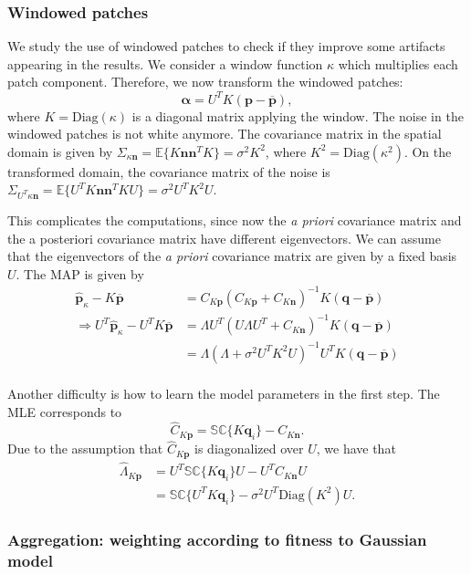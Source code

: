 \documentclass{ipol}
\newcommand{\ma}[1]{\boldsymbol{#1}}
\begin{document}
\clearpage

\subsubsection{Windowed patches}

We study the use of windowed patches to check if they improve some artifacts
appearing in the results. We consider a window function $\kappa$ which multiplies
each patch component. Therefore, we now transform the windowed patches:
\[\ma \alpha = U^TK(\ma p - \overline{\ma p}),\]
where $K = \text{Diag}(\kappa)$ is a diagonal matrix applying the window. The noise
in the windowed patches is not white anymore. The covariance matrix in the spatial
domain is given by $\Sigma_{\kappa\ma n} = \mathbb E\{K\ma n\ma n^TK\} = \sigma^2K^2$,
where $K^2 = \text{Diag}(\kappa^2)$. On the transformed domain, the covariance matrix
of the noise is $\Sigma_{U^T\kappa\ma n} = \mathbb E\{U^TK\ma n\ma n^TKU\} = \sigma^2U^TK^2U$.

This complicates the computations, since now the \emph{a priori} covariance
matrix and the a posteriori covariance matrix have different eigenvectors.
We can assume that the eigenvectors of the \emph{a priori} covariance matrix
are given by a fixed basis $U$. The MAP is given by
\begin{align*}
\hat{\ma p}_\kappa - K\overline{\ma p} &=  
                     C_{K\ma p} (C_{K\ma p} + C_{K\ma n})^{-1} K(\ma q - \overline{\ma p}) \\
\Rightarrow 
U^T\hat{\ma p}_\kappa - U^TK\overline{\ma p}  
&= \Lambda U^T  (U\Lambda U^T + C_{K\ma n})^{-1} K(\ma q - \overline{\ma p}) \\
&= \Lambda (\Lambda + \sigma^2U^TK^2U)^{-1} U^TK(\ma q - \overline{\ma p}) \\
\end{align*}

Another difficulty is how to learn the model parameters in the first step. The MLE 
corresponds to 
\[\hat C_{K\ma p} = \mathbb{SC}\{K\ma q_i\} - C_{K\ma n}.\]
Due to the assumption that 
$\hat C_{K\ma p}$ is diagonalized over $U$, we have that 
\begin{align*}
\hat \Lambda_{K\ma p} &= U^T\mathbb{SC}\{K\ma q_i\}U - U^TC_{K\ma n}U\\
&= \mathbb{SC}\{U^TK\ma q_i\} - \sigma^2U^T\text{Diag}(K^2)U.
\end{align*}




\subsubsection{Aggregation: weighting according to fitness to Gaussian model}
\end{document}
